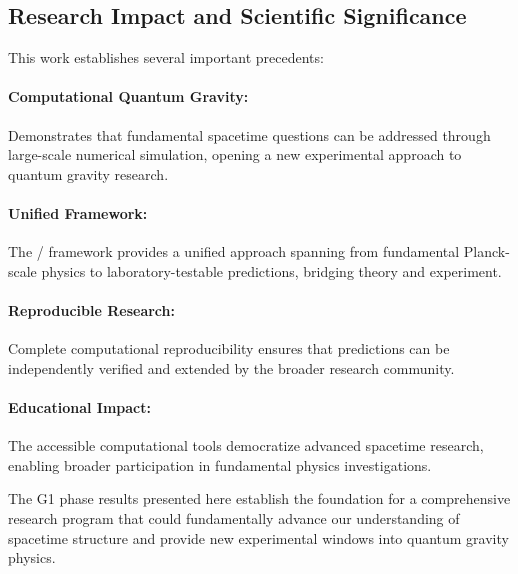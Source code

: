 \subsection{Research Impact and Scientific Significance}

This work establishes several important precedents:

\paragraph{Computational Quantum Gravity:}
Demonstrates that fundamental spacetime questions can be addressed through 
large-scale numerical simulation, opening a new experimental approach to 
quantum gravity research.

\paragraph{Unified Framework:}
The \posp{}/\saturon{} framework provides a unified approach spanning from 
fundamental Planck-scale physics to laboratory-testable predictions, bridging 
theory and experiment.

\paragraph{Reproducible Research:}
Complete computational reproducibility ensures that \posp{} predictions can 
be independently verified and extended by the broader research community.

\paragraph{Educational Impact:}
The accessible computational tools democratize advanced spacetime research, 
enabling broader participation in fundamental physics investigations.

The G1 phase results presented here establish the foundation for a comprehensive 
research program that could fundamentally advance our understanding of spacetime 
structure and provide new experimental windows into quantum gravity physics.

